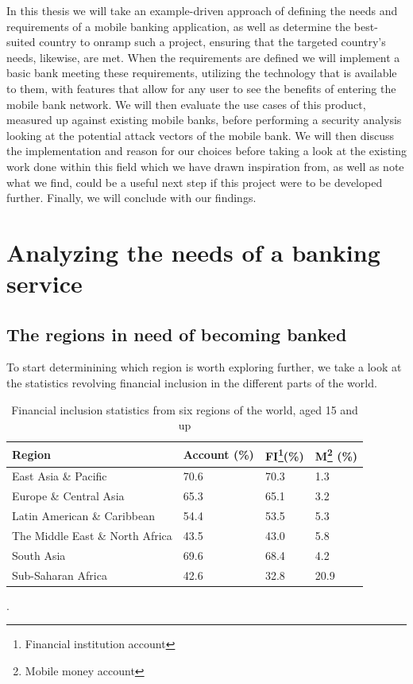 \documentclass[11pt, a4paper]{article}
\begin{document}
In this thesis we will take an example-driven approach of defining the needs and requirements of a mobile banking application, as well as determine the best-suited country to onramp such a project, ensuring that the targeted country's needs, likewise, are met. When the requirements are defined we will implement a basic bank meeting these requirements, utilizing the technology that is available to them, with features that allow for any user to see the benefits of entering the mobile bank network. We will then evaluate the use cases of this product, measured up against existing mobile banks, before performing a security analysis looking at the potential attack vectors of the mobile bank. We will then discuss the implementation and reason for our choices before taking a look at the existing work done within this field which we have drawn inspiration from, as well as note what we find, could be a useful next step if this project were to be developed further. Finally, we will conclude with our findings.


\section{Analyzing the needs of a banking service}
\subsection{The regions in need of becoming banked}
To start determinining which region is worth exploring further, we take a look at the statistics revolving financial inclusion in the different parts of the world.
\begin{table}[!ht]
\begin{tabular}{|l|l|l|l|}
\hline
\textbf{Region}       & \textbf{Account (\%)} & \textbf{FI\footnote{Financial institution account}(\%)} & \textbf{M\footnote{Mobile money account} (\%)} \\ \hline
East Asia \& Pacific    & 70.6          & 70.3           & 1.3                \\ \hline
Europe \& Central Asia    & 65.3          & 65.1           & 3.2                \\ \hline
Latin American \& Caribbean & 54.4          & 53.5           & 5.3                \\ \hline
The Middle East \& North Africa & 43.5          & 43.0           & 5.8                \\ \hline
South Asia          & 69.6          & 68.4           & 4.2                \\ \hline
Sub-Saharan Africa      & 42.6          & 32.8           & 20.9                 \\ \hline
\end{tabular}
\caption{Financial inclusion statistics from six regions of the world, aged 15 and up\cite{littledata}}.
\label{tab:financial_statistics}
\end{table}
\end{document}
